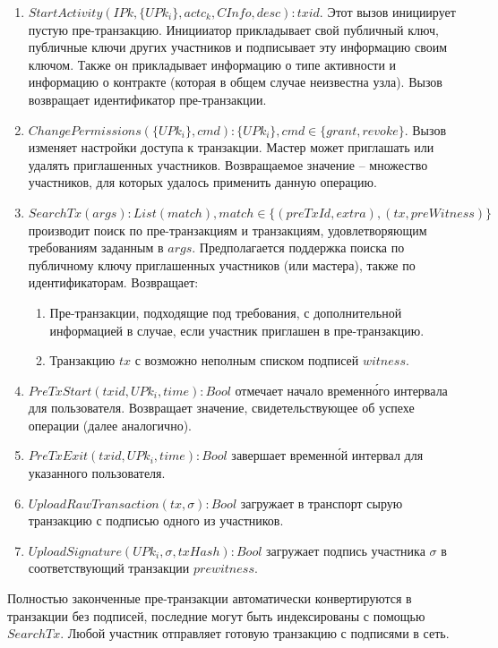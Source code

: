 \documentclass[specification,annotation]{itmo-student-thesis}
\begin{document}
\begin{enumerate}
\item $StartActivity(IPk, \{UPk_i\}, actc_k, CInfo, desc) : txid$. Этот
  вызов инициирует пустую пре-транзакцию. Иницииатор прикладывает свой
  публичный ключ, публичные ключи других участников и подписывает эту
  информацию своим ключом. Также он прикладывает информацию о типе
  активности и информацию о контракте (которая в общем случае
  неизвестна узла). Вызов возвращает идентификатор пре-транзакции.
\item $ChangePermissions(\{UPk_i\}, cmd) : \{UPk_i\}, cmd \in
  \{grant,revoke\}$. Вызов изменяет настройки доступа к
  транзакции. Мастер может приглашать или удалять приглашенных
  участников. Возвращаемое значение -- множество участников, для
  которых удалось применить данную операцию.
\item $SearchTx(args) : List(match), match \in \{(preTxId,extra),
  (tx,preWitness)\}$ производит поиск по пре-транзакциям и транзакциям,
  удовлетворяющим требованиям заданным в $args$. Предполагается
  поддержка поиска по публичному ключу приглашенных участников (или
  мастера), также по идентификаторам. Возвращает:
  \begin{enumerate}
  \item Пре-транзакции, подходящие под требования, с дополнительной
    информацией в случае, если участник приглашен в пре-транзакцию.
  \item Транзакцию $tx$ с возможно неполным списком подписей $witness$.
  \end{enumerate}
\item $PreTxStart(txid, UPk_i, time) : Bool$ отмечает начало
  временн\'{о}го интервала для пользователя. Возвращает значение,
  свидетельствующее об успехе операции (далее аналогично).
\item $PreTxExit(txid, UPk_i, time) : Bool$ завершает временн\'{о}й
  интервал для указанного пользователя.
\item $UploadRawTransaction(tx, \sigma) : Bool$ загружает в транспорт
  сырую транзакцию с подписью одного из участников.
\item $UploadSignature(UPk_i, \sigma, txHash) : Bool$ загружает
  подпись участника $\sigma$ в соответствующий транзакции
  $prewitness$.
\end{enumerate}

Полностью законченные пре-транзакции автоматически конвертируются в
транзакции без подписей, последние могут быть индексированы с помощью
$SearchTx$. Любой участник отправляет готовую транзакцию с подписями в
сеть.
\end{document}
